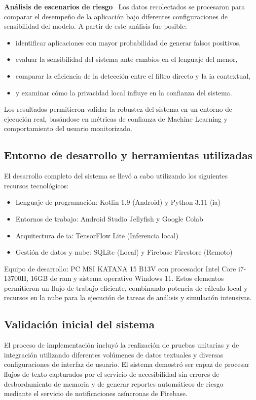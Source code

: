 \textbf{Análisis de escenarios de riesgo} \
Los datos recolectados se procesaron para comparar el desempeño de la aplicación bajo diferentes configuraciones de sensibilidad del modelo. A partir de este análisis fue posible:
\begin{itemize}
\item identificar aplicaciones con mayor probabilidad de generar falsos positivos,
\item evaluar la sensibilidad del sistema ante cambios en el lenguaje del menor,
\item comparar la eficiencia de la detección entre el filtro directo y la \gls{ia} contextual,
\item y examinar cómo la privacidad local influye en la confianza del sistema.
\end{itemize}
Los resultados permitieron validar la robustez del sistema en un entorno de ejecución real, basándose en métricas de confianza de Machine Learning y comportamiento del usuario monitorizado.

\subsection{Entorno de desarrollo y herramientas utilizadas}
El desarrollo completo del sistema se llevó a cabo utilizando los siguientes recursos tecnológicos:

\begin{itemize}
\item Lenguaje de programación: Kotlin 1.9 (Android) y Python 3.11 (\gls{ia})
\item Entornos de trabajo: Android Studio Jellyfish y Google Colab
\item Arquitectura de \gls{ia}: TensorFlow Lite (Inferencia local)
\item Gestión de datos y nube: SQLite (Local) y Firebase Firestore (Remoto)
\end{itemize}

Equipo de desarrollo: PC MSI KATANA 15 B13V con procesador Intel Core i7-13700H, 16GB de \gls{ram} y sistema operativo Windows 11. 
Estos elementos permitieron un flujo de trabajo eficiente, combinando potencia de cálculo local y recursos en la nube para la 
ejecución de tareas de análisis y simulación intensivas.


\subsection{Validación inicial del sistema}
El proceso de implementación incluyó la realización de pruebas unitarias y de integración utilizando diferentes volúmenes de datos textuales y diversas configuraciones de interfaz de usuario. El sistema demostró ser capaz de procesar flujos de texto capturados por el servicio de accesibilidad sin errores de desbordamiento de memoria y de generar reportes automáticos de riesgo mediante el servicio de notificaciones asíncronas de Firebase.


